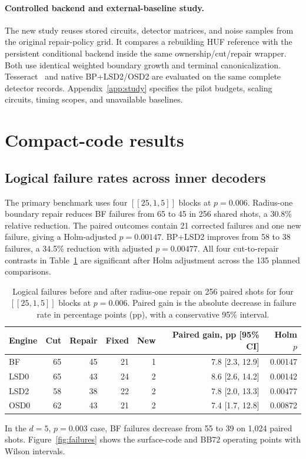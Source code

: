 \paragraph{Controlled backend and external-baseline study.}
The new study reuses stored circuits, detector matrices, and noise samples from the original repair-policy grid. It compares a rebuilding HUF reference with the persistent conditional backend inside the same ownership/cut/repair wrapper. Both use identical weighted boundary growth and terminal canonicalization. Tesseract~\cite{tesseract} and native BP+LSD2/OSD2 are evaluated on the same complete detector records. Appendix~\ref{app:study} specifies the pilot budgets, scaling circuits, timing scopes, and unavailable baselines.

\section{Compact-code results}\label{sec:results}
\subsection{Logical failure rates across inner decoders}
The primary benchmark uses four $[[25,1,5]]$ blocks at $p=0.006$. Radius-one boundary repair reduces BF failures from 65 to 45 in 256 shared shots, a 30.8\% relative reduction. The paired outcomes contain 21 corrected failures and one new failure, giving a Holm-adjusted $p=0.00147$. BP+LSD2 improves from 58 to 38 failures, a 34.5\% reduction with adjusted $p=0.00477$. All four cut-to-repair contrasts in Table~\ref{tab:primary} are significant after Holm adjustment across the 135 planned comparisons.

\begin{table}[t]\centering\small
\caption{Logical failures before and after radius-one repair on 256 paired shots for four $[[25,1,5]]$ blocks at $p=0.006$. Paired gain is the absolute decrease in failure rate in percentage points (pp), with a conservative 95\% interval.}\label{tab:primary}
\begin{tabular}{lrrrrrr}\toprule
Engine&Cut&Repair&Fixed&New&Paired gain, pp [95\% CI]&Holm $p$\\\midrule
BF&65&45&21&1&7.8 [2.3, 12.9]&0.00147\\
LSD0&65&43&24&2&8.6 [2.6, 14.2]&0.00142\\
LSD2&58&38&22&2&7.8 [2.0, 13.3]&0.00477\\
OSD0&62&43&21&2&7.4 [1.7, 12.8]&0.00872\\\bottomrule
\end{tabular}\end{table}
In the $d=5$, $p=0.003$ case, BF failures decrease from 55 to 39 on 1,024 paired shots. Figure~\ref{fig:failures} shows the surface-code and BB72 operating points with Wilson intervals.

